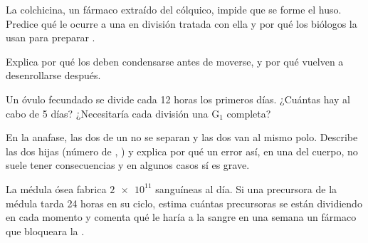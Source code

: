 \begin{exercise}[$\star\star$]\label{exo:g11:cell-cycle-mitosis:9}
La colchicina, un fármaco extraído del cólquico, impide que se forme el
huso. Predice qué le ocurre a una  en división tratada con ella y
por qué los biólogos la usan para preparar .
\end{exercise}

\begin{exercise}[$\star\star$]\label{exo:g11:cell-cycle-mitosis:10}
Explica por qué los  deben condensarse antes de moverse, y
por qué vuelven a desenrollarse después.
\end{exercise}

\begin{exercise}[$\star\star$]\label{exo:g11:cell-cycle-mitosis:11}
Un óvulo fecundado se divide cada 12 horas los primeros días. ¿Cuántas
 hay al cabo de 5 días? ¿Necesitaría cada división una
$\mathrm{G_1}$ completa?
\end{exercise}

\begin{exercise}[$\star\star\star$]\label{exo:g11:cell-cycle-mitosis:12}
En la anafase, las dos  de un  no se separan y las
dos van al mismo polo. Describe las dos  hijas (número de
, ) y explica por qué un error así, en una  del
cuerpo, no suele tener consecuencias y en algunos casos sí es grave.
\end{exercise}

\begin{exercise}[$\star\star\star$]\label{exo:g11:cell-cycle-mitosis:13}
La médula ósea fabrica $\num{2e11}$  sanguíneas al día. Si una
 precursora de la médula tarda 24 horas en su ciclo, estima
cuántas precursoras se están dividiendo en cada momento y comenta qué
le haría a la sangre en una semana un fármaco que bloqueara la .
\end{exercise}

